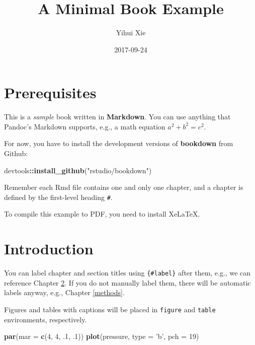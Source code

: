 \documentclass[]{book}
\title{A Minimal Book Example}
\author{Yihui Xie}
\date{2017-09-24}
\newenvironment{Shaded}{\begin{snugshade}}{\end{snugshade}}
\newcommand{\KeywordTok}[1]{\textcolor[rgb]{0.13,0.29,0.53}{\textbf{#1}}}
\newcommand{\DataTypeTok}[1]{\textcolor[rgb]{0.13,0.29,0.53}{#1}}
\newcommand{\DecValTok}[1]{\textcolor[rgb]{0.00,0.00,0.81}{#1}}
\newcommand{\StringTok}[1]{\textcolor[rgb]{0.31,0.60,0.02}{#1}}
\newcommand{\OperatorTok}[1]{\textcolor[rgb]{0.81,0.36,0.00}{\textbf{#1}}}
\newcommand{\NormalTok}[1]{#1}
\theoremstyle{definition}
\theoremstyle{definition}
\theoremstyle{definition}
\theoremstyle{remark}
\begin{document}
\maketitle

{
\setcounter{tocdepth}{1}
\tableofcontents
}
\chapter{Prerequisites}\label{prerequisites}

This is a \emph{sample} book written in \textbf{Markdown}. You can use
anything that Pandoc's Markdown supports, e.g., a math equation
\(a^2 + b^2 = c^2\).

For now, you have to install the development versions of
\textbf{bookdown} from Github:

\begin{Shaded}
\begin{Highlighting}[]
\NormalTok{devtools}\OperatorTok{::}\KeywordTok{install_github}\NormalTok{(}\StringTok{"rstudio/bookdown"}\NormalTok{)}
\end{Highlighting}
\end{Shaded}

Remember each Rmd file contains one and only one chapter, and a chapter
is defined by the first-level heading \texttt{\#}.

To compile this example to PDF, you need to install XeLaTeX.

\chapter{Introduction}\label{intro}

You can label chapter and section titles using \texttt{\{\#label\}}
after them, e.g., we can reference Chapter \ref{intro}. If you do not
manually label them, there will be automatic labels anyway, e.g.,
Chapter \ref{methods}.

Figures and tables with captions will be placed in \texttt{figure} and
\texttt{table} environments, respectively.

\begin{Shaded}
\begin{Highlighting}[]
\KeywordTok{par}\NormalTok{(}\DataTypeTok{mar =} \KeywordTok{c}\NormalTok{(}\DecValTok{4}\NormalTok{, }\DecValTok{4}\NormalTok{, .}\DecValTok{1}\NormalTok{, .}\DecValTok{1}\NormalTok{))}
\KeywordTok{plot}\NormalTok{(pressure, }\DataTypeTok{type =} \StringTok{'b'}\NormalTok{, }\DataTypeTok{pch =} \DecValTok{19}\NormalTok{)}
\end{Highlighting}
\end{Shaded}
\end{document}
